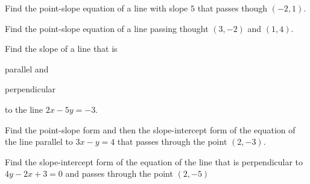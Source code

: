 \newpage
\begin{exercise}\label{par}
Find the point-slope equation of a line with slope $5$ that passes though $(-2, 1)$.
\end{exercise}

\vfill

\begin{exercise}\label{par}
Find the point-slope equation of a line passing thought $(3, -2)$ and $(1,4)$.
\end{exercise}

\vfill


\begin{exercise}\label{par}
Find the slope of a line that is \begin{enumerate*}[label={\textup{~~(\arabic*)~~}}]\item parallel and \item perpendicular\end{enumerate*} to the line  $2x-5y=-3$.
\end{exercise}

\vfill



\begin{exercise}\label{par}
Find the point-slope form and then the slope-intercept form of the equation of the line parallel to $3x-y=4$ that passes through the point $(2,-3)$.
\end{exercise}

\vfill
\begin{exercise}\label{perp}
Find the slope-intercept form of the equation of the line that is perpendicular to $4y-2x+3=0$ and passes through the point $(2, -5)$
\end{exercise}


\vfill

